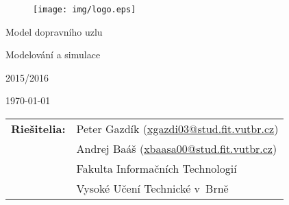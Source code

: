 \begin{titlepage}

\vspace*{2cm}
\begin{figure}[!h]
  \centering
  \texttt{[image: img/logo.eps]}
\end{figure}

\vfill

\begin{center}

\begin{Huge}
  Model dopravního uzlu
\end{Huge}

\bigskip

\begin{Large}
  Modelování a simulace
\end{Large}

\bigskip

\begin{Large}
	2015/2016
\end{Large}

\end{center}

\vfill

\begin{center}
\begin{Large}
\today
\end{Large}
\end{center}

\vfill

\begin{flushleft}
\begin{normalsize}
\begin{tabular}{ll}
\bf Riešitelia:\hspace{3mm} & Peter Gazdík (\url{xgazdi03@stud.fit.vutbr.cz}) \\
& Andrej Baáš (\url{xbaasa00@stud.fit.vutbr.cz}) \\[3mm]

& Fakulta Informačních Technologií \\
& Vysoké Učení Technické v~Brně
\end{tabular}
\end{normalsize}
\end{flushleft}
\end{titlepage}
